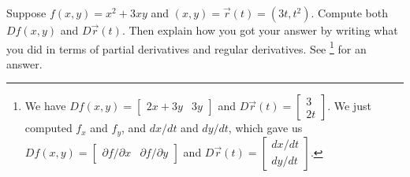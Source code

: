 

\begin{review*}
Suppose $f(x,y)=x^2+3xy$ and $(x,y) = \vec r(t) = (3t,t^2)$.  
Compute both $Df(x,y)$ and $D\vec r(t)$. Then explain how you got your answer by writing what you did in terms of partial derivatives and regular derivatives. See \footnote{We have 
$Df(x,y) = \begin{bmatrix}2x+3y&3y\end{bmatrix}$ and 
$D\vec r(t) = \begin{bmatrix}3\\2t\end{bmatrix}$. 
We just computed $f_x$ and $f_y$, and $dx/dt$ and $dy/dt$, which gave us
$Df(x,y) = \begin{bmatrix}\partial f/\partial x&\partial f/\partial y\end{bmatrix}$ and 
$D\vec r(t) = \begin{bmatrix}dx/dt\\dy/dt\end{bmatrix}$.} 
for an answer.
\end{review*}



